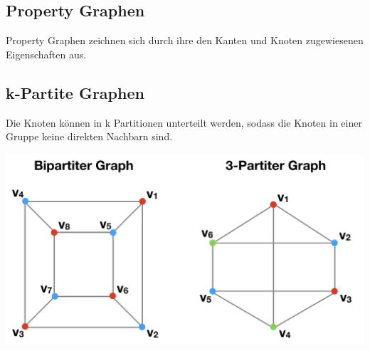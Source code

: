 \subsection{Property Graphen}
Property Graphen zeichnen sich durch ihre den Kanten und Knoten zugewiesenen Eigenschaften aus.
\subsection{k-Partite Graphen}
Die Knoten können in k Partitionen unterteilt werden, sodass die Knoten in einer Gruppe keine direkten Nachbarn sind.
\begin{center}
	\includegraphics[scale = 0.4]{./images/k_partiter_graph.png}
\end{center}
